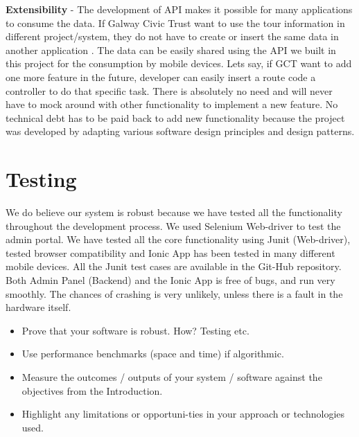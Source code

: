     \textbf{Extensibility} - The development of API makes it possible for many applications to consume the data. If Galway Civic Trust want to use the tour information in different project/system, they do not have to create or insert the same data in another application . The data can be easily shared using the API we built in this project for the consumption by mobile devices.
    Lets say, if GCT want to add one more feature in the future, developer can easily insert a route code a controller to do that specific task. There is absolutely no need and will never have to mock around with other functionality to implement a new feature. No technical debt has to be paid back to add new functionality because the project was developed by adapting various software design principles and design patterns. 
    
	\section{Testing}
	We do believe our system is robust because we have tested all the functionality throughout the development process. We used Selenium Web-driver to test the admin portal. We have tested all the core functionality using Junit (Web-driver), tested browser compatibility and Ionic App has been tested in many different mobile devices. All the Junit test cases are available in the Git-Hub repository. Both Admin Panel (Backend)  and the Ionic App is free of bugs, and run very smoothly.  The chances of crashing is very unlikely, unless there is a fault in the hardware itself.  
	
	
\begin{itemize}
	\item Prove that your software is robust. How? Testing etc. 
	\item Use performance benchmarks (space and time) if algorithmic.
	\item Measure the outcomes / outputs of your system / software against the objectives from the Introduction.
	\item Highlight any limitations or opportuni-ties in your approach or technologies used.
\end{itemize}

